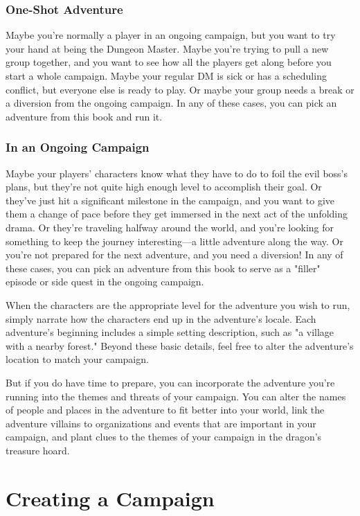 \documentclass[letterpaper, 11pt, twocolumn]{dndbook}
\begin{document}
\subsubsection{One-Shot Adventure}

Maybe you're normally a player in an ongoing campaign, but you want to try your hand at being the Dungeon Master. Maybe you're trying to pull a new group together, and you want to see how all the players get along before you start a whole campaign. Maybe your regular DM is sick or has a scheduling conflict, but everyone else is ready to play. Or maybe your group needs a break or a diversion from the ongoing campaign. In any of these cases, you can pick an adventure from this book and run it.

\subsubsection{In an Ongoing Campaign}

Maybe your players' characters know what they have to do to foil the evil boss's plans, but they're not quite high enough level to accomplish their goal. Or they've just hit a significant milestone in the campaign, and you want to give them a change of pace before they get immersed in the next act of the unfolding drama. Or they're traveling halfway around the world, and you're looking for something to keep the journey interesting---a little adventure along the way. Or you're not prepared for the next adventure, and you need a diversion! In any of these cases, you can pick an adventure from this book to serve as a "filler" episode or side quest in the ongoing campaign.


When the characters are the appropriate level for the adventure you wish to run, simply narrate how the characters end up in the adventure's locale. Each adventure's beginning includes a simple setting description, such as "a village with a nearby forest." Beyond these basic details, feel free to alter the adventure's location to match your campaign.

But if you do have time to prepare, you can incorporate the adventure you're running into the themes and threats of your campaign. You can alter the names of people and places in the adventure to fit better into your world, link the adventure villains to organizations and events that are important in your campaign, and plant clues to the themes of your campaign in the dragon's treasure hoard.
\section{Creating a Campaign}
\end{document}
